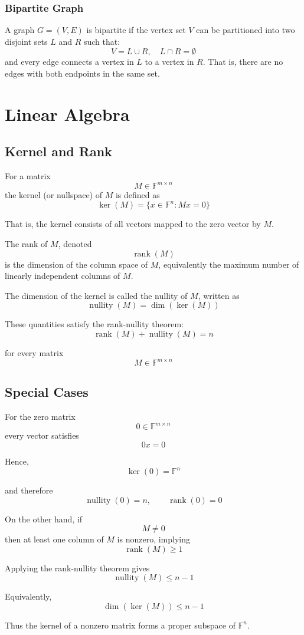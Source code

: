 \documentclass[11pt,openany]{book}
\begin{document}
\subsection*{Bipartite Graph}

A graph \(G=(V,E)\) is bipartite if the vertex set \(V\) can be partitioned into two disjoint sets \(L\) and \(R\) such that:
\[
V=L\cup R,\quad L\cap R=\emptyset
\]
and every edge connects a vertex in \(L\) to a vertex in \(R\). That is, there are no edges with both endpoints in the same set.

\chapter{Linear Algebra}

\section{Kernel and Rank}

For a matrix
\[
M\in\mathbb{F}^{m\times n}
\]
the kernel (or nullspace) of \(M\) is defined as
\[
\ker(M)=\{x\in\mathbb{F}^n: Mx=0\}
\]

That is, the kernel consists of all vectors mapped to the zero vector by \(M\).

The rank of \(M\), denoted
\[
\operatorname{rank}(M)
\]
is the dimension of the column space of \(M\), equivalently the maximum number of linearly independent columns of \(M\).

The dimension of the kernel is called the nullity of \(M\), written as
\[
\operatorname{nullity}(M)=\dim(\ker(M))
\]

These quantities satisfy the rank-nullity theorem:
\[
\operatorname{rank}(M)+\operatorname{nullity}(M)=n
\]

for every matrix
\[
M\in\mathbb{F}^{m\times n}
\]



\section{Special Cases}

For the zero matrix
\[
0\in\mathbb{F}^{m\times n}
\]
every vector satisfies
\[
0x=0
\]

Hence,
\[
\ker(0)=\mathbb{F}^n
\]

and therefore
\[
\operatorname{nullity}(0)=n,
\qquad
\operatorname{rank}(0)=0
\]

On the other hand, if
\[
M\neq0
\]
then at least one column of \(M\) is nonzero, implying
\[
\operatorname{rank}(M)\ge1
\]

Applying the rank-nullity theorem gives
\[
\operatorname{nullity}(M)\le n-1
\]

Equivalently,
\[
\dim(\ker(M))\le n-1
\]

Thus the kernel of a nonzero matrix forms a proper subspace of \(\mathbb{F}^n\).
\end{document}
